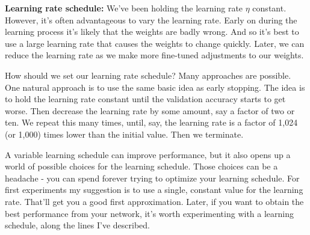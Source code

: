 \textbf{Learning rate schedule:} We've been holding the learning rate $\eta$
constant. However, it's often advantageous to vary the learning rate. Early on during the learning process it's likely that the weights are badly wrong. And so it's best to use a large learning rate that causes the weights to change quickly. Later, we can reduce the learning rate as we make more fine-tuned adjustments to our weights.

How should we set our learning rate schedule? Many approaches are possible. One natural approach is to use the same basic idea as early stopping. The idea is to hold the learning rate constant until the validation accuracy starts to get worse. Then decrease the learning rate by some amount, say a factor of two or ten. We repeat this many times, until, say, the learning rate is a factor of 1,024 (or 1,000) times lower than the initial value. Then we terminate.

A variable learning schedule can improve performance, but it also opens up a world of possible choices for the learning schedule. Those choices can be a headache - you can spend forever trying to optimize your learning schedule. For first experiments my suggestion is to use a single, constant value for the learning rate. That'll get you a good first approximation. Later, if you want to obtain the best performance from your network, it's worth experimenting with a learning schedule, along the lines I've described.

